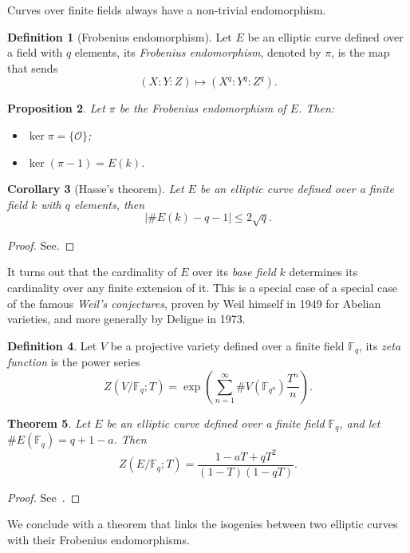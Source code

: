 \documentclass[10pt]{article}
\theoremstyle{plain}
\newtheorem{theorem}{Theorem}
\newtheorem{corollary}[theorem]{Corollary}
\newtheorem{proposition}[theorem]{Proposition}
\theoremstyle{definition}
\newtheorem{definition}[theorem]{Definition}
\def\F{\ensuremath{\mathbb{F}}}
\def\O{\ensuremath{\mathcal{O}}}
\begin{document}
Curves over finite fields always have a non-trivial endomorphism.

\begin{definition}[Frobenius endomorphism]
  Let $E$ be an elliptic curve defined over a field with $q$ elements,
  its \emph{Frobenius endomorphism}, denoted by $π$, is the map that
  sends
  \[(X:Y:Z) \mapsto (X^q:Y^q:Z^q).\]
\end{definition}

\begin{proposition}
  \label{th:frob}
  Let $π$ be the Frobenius endomorphism of $E$. Then:
  \begin{itemize}
  \item $\ker π = \{\O\}$;
  \item $\ker (π-1) = E(k)$.
  \end{itemize}
\end{proposition}

\begin{corollary}[Hasse's theorem]
  Let $E$ be an elliptic curve defined over a finite field $k$ with $q$
  elements, then
  \[|\#E(k) - q - 1| ≤ 2\sqrt{q}.\]
\end{corollary}
\begin{proof}
  See\cite[V, Th.~1.1]{silverman:elliptic}.
\end{proof}

It turns out that the cardinality of $E$ over its \emph{base field}
$k$ determines its cardinality over any finite extension of it. %
This is a special case of a special case of the famous \emph{Weil's
  conjectures}, proven by Weil himself in 1949 for Abelian varieties,
and more generally by Deligne in 1973.

\begin{definition}
  Let $V$ be a projective variety defined over a finite field $\F_q$,
  its \emph{zeta function} is the power series
  \[Z(V/\F_q; T) = \exp\left(\sum_{n=1}^∞\#V(\F_{q^n})\frac{T^n}{n}\right).\]
\end{definition}

\begin{theorem}
  \label{th:weil}
  Let $E$ be an elliptic curve defined over a finite field
  $\F_q$, and let $\#E(\F_q)=q+1-a$. Then
  \[Z(E/\F_q;T) = \frac{1-aT+qT^2}{(1-T)(1-qT)}.\]
\end{theorem}
\begin{proof}
  See~\cite[V, Th.~2.4]{silverman:elliptic}.
\end{proof}

We conclude with a theorem that links the isogenies between two
elliptic curves with their Frobenius endomorphisms.
\end{document}
